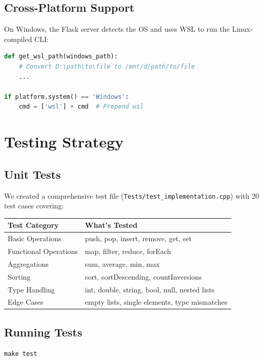 \documentclass[11pt,a4paper]{article}
\begin{document}
\subsection{Cross-Platform Support}

On Windows, the Flask server detects the OS and uses WSL to run the Linux-compiled CLI:

\begin{lstlisting}[language=Python]
def get_wsl_path(windows_path):
    # Convert D:\path\to\file to /mnt/d/path/to/file
    ...

if platform.system() == 'Windows':
    cmd = ['wsl'] + cmd  # Prepend wsl
\end{lstlisting}

\section{Testing Strategy}

\subsection{Unit Tests}

We created a comprehensive test file (\texttt{Tests/test\_implementation.cpp}) with 20 test cases covering:

\begin{center}
\begin{tabular}{|l|p{9cm}|}
\hline
\textbf{Test Category} & \textbf{What's Tested} \\
\hline
Basic Operations & push, pop, insert, remove, get, set \\
Functional Operations & map, filter, reduce, forEach \\
Aggregations & sum, average, min, max \\
Sorting & sort, sortDescending, countInversions \\
Type Handling & int, double, string, bool, null, nested lists \\
Edge Cases & empty lists, single elements, type mismatches \\
\hline
\end{tabular}
\end{center}

\subsection{Running Tests}

\begin{verbatim}
make test
\end{verbatim}
\end{document}
